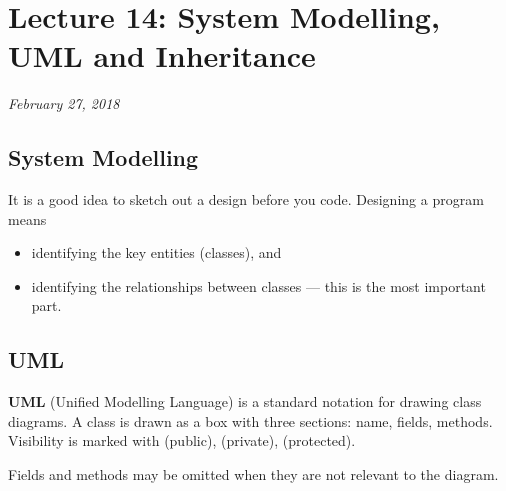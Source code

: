 \chapter{Lecture 14: System Modelling, UML and Inheritance}
\begin{center}
\textit{February 27, 2018}
\end{center}

\section{System Modelling}
It is a good idea to sketch out a design before you code. Designing a program
means
\begin{itemize}
  \item identifying the key entities (classes), and
  \item identifying the relationships between classes --- this is the most
        important part.
\end{itemize}

\section{UML}
\textbf{UML} (Unified Modelling Language) is a standard notation for drawing
class diagrams. A class is drawn as a box with three sections: name, fields,
methods. Visibility is marked with \code{+} (public), \code{-} (private),
\code{\#} (protected).

\begin{center}
\end{center}

Fields and methods may be omitted when they are not relevant to the diagram.

